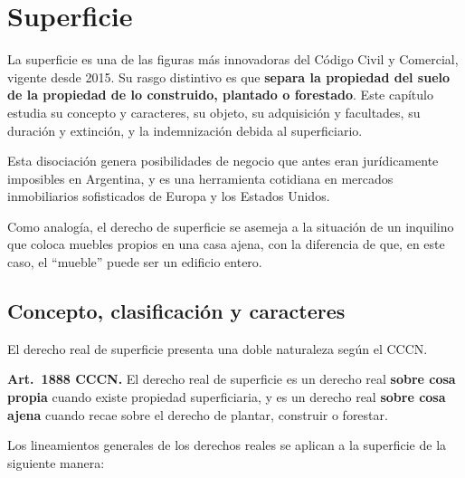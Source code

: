 \documentclass[12pt,oneside]{book}
\begin{document}
\chapter{Superficie}\label{cap:superficie}

La superficie es una de las figuras más innovadoras del Código Civil y Comercial, vigente desde 2015. Su rasgo distintivo es que \textbf{separa la propiedad del suelo de la propiedad de lo construido, plantado o forestado}. Este capítulo estudia su concepto y caracteres, su objeto, su adquisición y facultades, su duración y extinción, y la indemnización debida al superficiario.

\begin{importante}
Esta disociación genera posibilidades de negocio que antes eran jurídicamente imposibles en Argentina, y es una herramienta cotidiana en mercados inmobiliarios sofisticados de Europa y los Estados Unidos.
\end{importante}

\begin{nota}
Como analogía, el derecho de superficie se asemeja a la situación de un inquilino que coloca muebles propios en una casa ajena, con la diferencia de que, en este caso, el ``mueble'' puede ser un edificio entero.
\end{nota}

\section{Concepto, clasificación y caracteres}

El derecho real de superficie presenta una doble naturaleza según el CCCN.

\begin{importante}
\textbf{Art.~1888 CCCN.} El derecho real de superficie es un derecho real \textbf{sobre cosa propia} cuando existe propiedad superficiaria, y es un derecho real \textbf{sobre cosa ajena} cuando recae sobre el derecho de plantar, construir o forestar.
\end{importante}

Los lineamientos generales de los derechos reales se aplican a la superficie de la siguiente manera:
\end{document}

